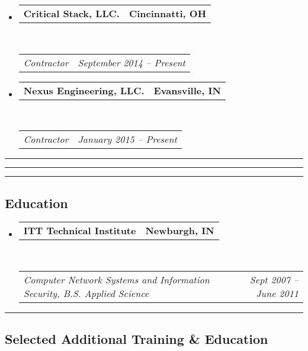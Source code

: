 \documentclass[10pt,letterpaper]{article}
\makeatletter
\newcommand{\headerrow}[2]
{\begin{tabular*}{\linewidth}{l@{\extracolsep{\fill}}r}
	#1 &
	#2 \\
\end{tabular*}}
\makeatother
\begin{document}
\begin{itemize}
\item
	\headerrow
		{\textbf{Critical Stack, LLC.}}
		{\textbf{Cincinnatti, OH}}
	\\
	\headerrow
		{\emph{Contractor}}
		{\emph{September 2014 -- Present}}
\end{itemize}

\begin{itemize}
\item
	\headerrow
		{\textbf{Nexus Engineering, LLC.}}
		{\textbf{Evansville, IN}}
	\\
	\headerrow
		{\emph{Contractor}}
		{\emph{January 2015 -- Present}}
\end{itemize}

\hrule

\newpage

\hrule

\hrule
\vspace{-0.4em}
\subsection*{Education}

\begin{itemize}
	\parskip=0.1em

	\item
	\headerrow
		{\textbf{ITT Technical Institute}}
		{\textbf{Newburgh, IN}}
	\\
	\headerrow
		{\emph{Computer Network Systems and Information Security, B.S. Applied Science}}
		{\emph{Sept 2007 -- June 2011}}

\end{itemize}

\hrule
\vspace{-0.4em}

\subsection*{Selected Additional Training \& Education}
\end{document}
